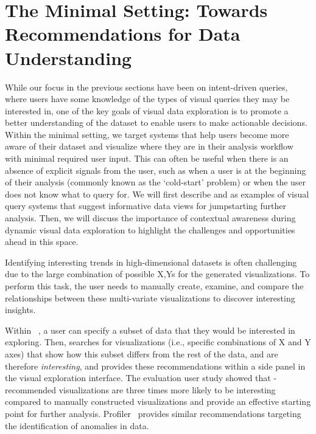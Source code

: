 \section{The Minimal Setting: Towards Recommendations for Data Understanding}\label{sec:minimal}
\par While our focus in the previous sections 
have been on intent-driven queries, 
where users have some knowledge 
of the types of visual queries they may be interested in, 
one of the key goals of visual data exploration 
is to promote a better understanding of the dataset 
to enable users to make actionable decisions. 
Within the minimal setting, we target
systems that help users become more 
aware of their dataset and visualize 
where they are in their analysis workflow 
with minimal required user input. 
This can often be useful when 
there is an absence of explicit signals from the user, 
such as when a user is at the 
beginning of their analysis 
(commonly known as the `cold-start' problem) 
or when the user does not know what to query for. 
We will first describe \seedb and \sbd as 
examples of visual query systems 
that suggest informative data views 
for jumpstarting further analysis. 
Then, we will discuss the importance 
of contextual awareness during dynamic visual data exploration to highlight the challenges and opportunities ahead in this space.

\smallskip
{}
Identifying interesting trends in 
high-dimensional datasets is often challenging 
due to the large combination of possible X,Ys 
for the generated visualizations. 
To perform this task, 
the user needs to manually create, 
examine, and compare the relationships 
between these multi-variate visualizations 
to discover interesting insights. 

\par Within \seedb~\cite{Vartak2015},
a user can specify a subset of data 
that they would be interested in exploring. 
Then, \seedb searches for visualizations
(i.e., specific combinations of X and Y axes)
that show how this subset differs from the rest 
of the data, and are
therefore {\em interesting},
and provides these recommendations within a side panel
in the visual exploration interface.
The evaluation user study showed that 
\seedb-recommended visualizations are 
three times more likely to be interesting 
compared to manually constructed visualizations 
and provide an effective starting point for further analysis.
Profiler~\cite{Kandel2012} provides similar
recommendations targeting the identification of
anomalies in data.


